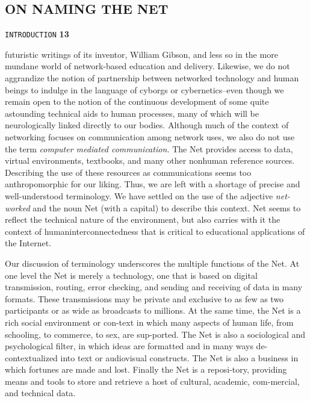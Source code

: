 \documentclass[8pt]{beamer}
\begin{document}
\begin{frame}
\section*{ON NAMING THE NET}
\begin{flushright}
 \texttt{INTRODUCTION} \hspace*{1cm} \textbf{13}
\end{flushright}

\vspace*{0.5cm}
futuristic writings of its inventor, William Gibson, and less so in the more mundane world of network-based education and delivery. Likewise, we do not aggrandize the notion of partnership between networked technology and human beings to indulge in the language of cyborgs or cybernetics--even though we remain open to the notion of the continuous development of some quite astounding technical aids to human processes, many of which will be neurologically linked directly to our bodies. Although much of the context of networking focuses on communication among network uses, we also do not use the term \emph{computer mediated communication.} The Net provides access to data, virtual environments, textbooks, and many other nonhuman reference sources. Describing the use of these resources as communications seems too anthropomorphic for our liking. Thus, we are left with a shortage of precise and well-understood terminology. We have settled on the use of the adjective \emph{net-worked} and the noun Net (with a capital) to describe this context. Net seems to reflect the technical nature of the environment, but also carries with it the context of humaninterconnectedness that is critical to educational applications of the Internet.\\
\end{frame}

\begin{frame}
\hspace*{0.4cm} Our discussion of terminology underscores the multiple functions of the Net. At one level the Net is merely a technology, one that is based on digital transmission, routing, error checking, and sending and receiving of data in many formats. These transmissions may be private and exclusive to as few as two participants or as wide as broadcasts to millions. At the same time, the Net is a rich social environment or con-text in which many aspects of human life, from schooling, to commerce, to sex, are sup-ported. The Net is also a sociological and psychological filter, in which ideas are formatted and in many ways de-contextualized into text or audiovisual constructs. The Net is also a business in which fortunes are made and lost. Finally the Net is a reposi-tory, providing means and tools to store and retrieve a host of cultural, academic, com-mercial, and technical data.\\
\end{frame}
\end{document}
